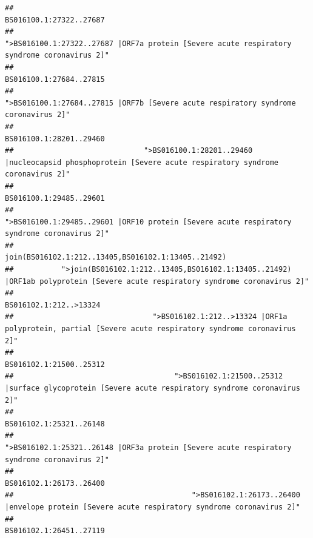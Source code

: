 \documentclass[
]{article}
\begin{document}
\begin{verbatim}
##                                                                                                                BS016100.1:27322..27687 
##                                            ">BS016100.1:27322..27687 |ORF7a protein [Severe acute respiratory syndrome coronavirus 2]" 
##                                                                                                                BS016100.1:27684..27815 
##                                                    ">BS016100.1:27684..27815 |ORF7b [Severe acute respiratory syndrome coronavirus 2]" 
##                                                                                                                BS016100.1:28201..29460 
##                              ">BS016100.1:28201..29460 |nucleocapsid phosphoprotein [Severe acute respiratory syndrome coronavirus 2]" 
##                                                                                                                BS016100.1:29485..29601 
##                                            ">BS016100.1:29485..29601 |ORF10 protein [Severe acute respiratory syndrome coronavirus 2]" 
##                                                                                    join(BS016102.1:212..13405,BS016102.1:13405..21492) 
##           ">join(BS016102.1:212..13405,BS016102.1:13405..21492) |ORF1ab polyprotein [Severe acute respiratory syndrome coronavirus 2]" 
##                                                                                                                 BS016102.1:212..>13324 
##                                ">BS016102.1:212..>13324 |ORF1a polyprotein, partial [Severe acute respiratory syndrome coronavirus 2]" 
##                                                                                                                BS016102.1:21500..25312 
##                                     ">BS016102.1:21500..25312 |surface glycoprotein [Severe acute respiratory syndrome coronavirus 2]" 
##                                                                                                                BS016102.1:25321..26148 
##                                            ">BS016102.1:25321..26148 |ORF3a protein [Severe acute respiratory syndrome coronavirus 2]" 
##                                                                                                                BS016102.1:26173..26400 
##                                         ">BS016102.1:26173..26400 |envelope protein [Severe acute respiratory syndrome coronavirus 2]" 
##                                                                                                                BS016102.1:26451..27119 

\end{verbatim}
\end{document}
